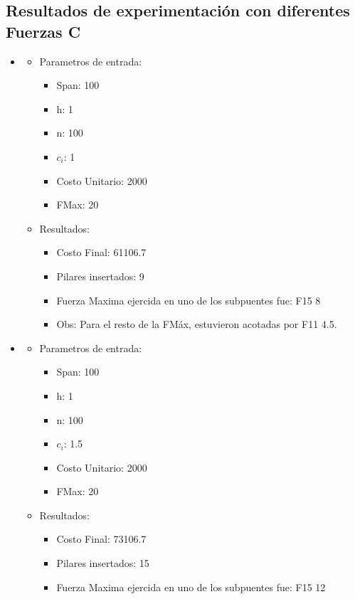 \subsection{Resultados de experimentaci\'on con diferentes Fuerzas C}
\begin{itemize}
\item
  \begin{itemize}
    \item Parametros de entrada:
	  \begin{itemize}
	    \item Span: 100
	    \item h: 1
	    \item n: 100
	    \item $c_i$: 1
	    \item Costo Unitario: 2000
	    \item FMax: 20
	  \end{itemize}
      \item Resultados:
	  \begin{itemize}
	    \item Costo Final: 61106.7
	    \item Pilares insertados: 9
	    \item Fuerza Maxima ejercida en uno de los subpuentes fue: F15 8
	    \item Obs: Para el resto de la FM\'ax, estuvieron acotadas por F11 4.5.
	  \end{itemize}
      \end{itemize}
\item
  \begin{itemize}
    \item Parametros de entrada:
	  \begin{itemize}
	    \item Span: 100
	    \item h: 1
	    \item n: 100
	    \item $c_i$: 1.5
	    \item Costo Unitario: 2000
	    \item FMax: 20
	  \end{itemize}
      \item Resultados:
	  \begin{itemize}
	    \item Costo Final: 73106.7
	    \item Pilares insertados: 15
	    \item Fuerza Maxima ejercida en uno de los subpuentes fue: F15 12

\end{itemize}
\end{itemize}
\end{itemize}

